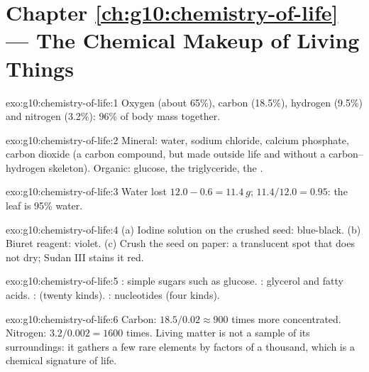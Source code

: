 \section*{Chapter \ref{ch:g10:chemistry-of-life} --- The Chemical Makeup of Living Things}

\begin{solution}{exo:g10:chemistry-of-life:1}
Oxygen (about 65\%), carbon (18.5\%), hydrogen (9.5\%) and nitrogen
(3.2\%): 96\% of body mass together.
\end{solution}

\begin{solution}{exo:g10:chemistry-of-life:2}
Mineral: water, sodium chloride, calcium phosphate, carbon dioxide (a
carbon compound, but made outside life and without a carbon--hydrogen
skeleton). Organic: glucose, the triglyceride, the .
\end{solution}

\begin{solution}{exo:g10:chemistry-of-life:3}
Water lost $12.0 - 0.6 = \qty{11.4}{g}$; $11.4/12.0 = 0.95$: the leaf
is 95\% water.
\end{solution}

\begin{solution}{exo:g10:chemistry-of-life:4}
(a) Iodine solution on the crushed seed: blue-black. (b) Biuret
reagent: violet. (c) Crush the seed on paper: a translucent spot that
does not dry; Sudan III stains it red.
\end{solution}

\begin{solution}{exo:g10:chemistry-of-life:5}
: simple sugars such as glucose. : glycerol and
fatty acids. :  (twenty kinds). :
nucleotides (four kinds).
\end{solution}

\begin{solution}{exo:g10:chemistry-of-life:6}
Carbon: $18.5/0.02 \approx 900$ times more concentrated. Nitrogen:
$3.2/0.002 = 1600$ times. Living matter is not a sample of its
surroundings: it gathers a few rare elements by factors of a thousand,
which is a chemical signature of life.
\end{solution}

